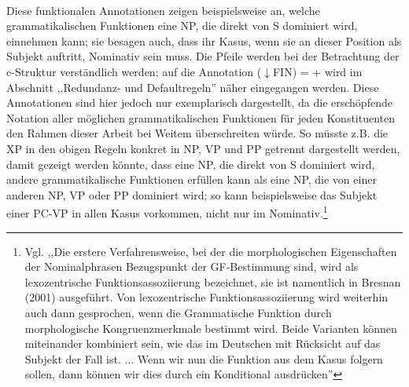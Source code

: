 \documentclass[12pt,a4paper]{article}
\begin{document}
\begin{singlespace}
\begin{tabular}{ l  l  c  c  c  c  c  c  c}
\end{tabular}\\
\newline
\end{singlespace}

Diese funktionalen Annotationen zeigen beispielsweise an, welche grammatikalischen Funktionen eine NP, die direkt von S dominiert wird, einnehmen kann; sie besagen auch, dass ihr Kasus, wenn sie an dieser Position als Subjekt auftritt, Nominativ sein muss. Die Pfeile werden bei der Betrachtung der c-Struktur verständlich werden; auf die Annotation ($\downarrow$FIN) = + wird im Abschnitt ,,Redundanz- und Defaultregeln'' näher eingegangen werden. Diese Annotationen sind hier jedoch nur exemplarisch dargestellt, da die erschöpfende Notation aller möglichen grammatikalischen Funktionen für jeden Konstituenten den Rahmen dieser Arbeit bei Weitem überschreiten würde. So müsste z.B. die XP in den obigen Regeln konkret in NP, VP und PP getrennt dargestellt werden, damit gezeigt werden könnte, dass eine NP, die direkt von S dominiert wird, andere grammatikalische Funktionen erfüllen kann als eine NP, die von einer anderen NP, VP oder PP dominiert wird; so kann beispielsweise das Subjekt einer PC-VP in allen Kasus vorkommen, nicht nur im Nominativ.\footnote{Vgl. \cite[48]{Skript},,Die erstere Verfahrensweise, bei der die morphologischen Eigenschaften der Nominalphrasen Bezugspunkt der GF-Bestimmung sind, wird als lexozentrische Funktionsassoziierung bezeichnet, sie ist namentlich in Bresnan (2001) ausgeführt. Von lexozentrische Funktionsassoziierung wird weiterhin auch dann gesprochen, wenn die Grammatische Funktion durch morphologische Kongruenzmerkmale bestimmt wird. Beide Varianten können miteinander kombiniert sein, wie das im Deutschen mit Rücksicht auf das Subjekt der Fall ist. ... Wenn wir nun die Funktion aus dem Kasus folgern sollen, dann können wir dies durch ein Konditional ausdrücken''}
\end{document}
